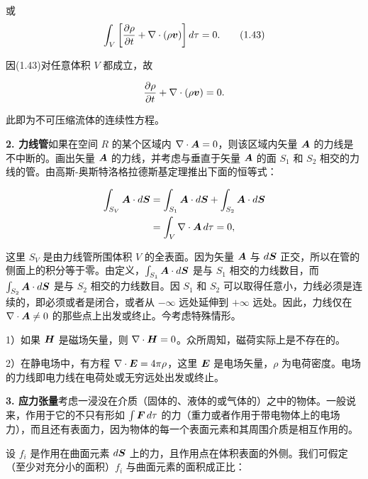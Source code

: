 或
\begin{equation}
\int_{V} \left[\frac{\partial\rho}{\partial t} + \nabla \cdot (\rho\bm{v})\right] d\tau = 0.
\tag{1.43}
\end{equation}

因(1.43)对任意体积 $V$ 都成立，故

\begin{equation*}
\frac{\partial\rho}{\partial t} + \nabla \cdot (\rho\bm{v}) = 0.
\end{equation*}

此即为不可压缩流体的连续性方程。

\textbf{2. 力线管}\quad 如果在空间 $R$ 的某个区域内 $\nabla \cdot \bm{A} = 0$，则该区域内矢量 $\bm{A}$ 的力线是不中断的。画出矢量 $\bm{A}$ 的力线，并考虑与垂直于矢量 $\bm{A}$ 的面 $S_1$ 和 $S_2$ 相交的力线的管。由高斯-奥斯特洛格拉德斯基定理推出下面的恒等式：

\begin{equation*}
\begin{aligned}
\int_{S_V} \bm{A} \cdot d\bm{S} &= \int_{S_1} \bm{A} \cdot d\bm{S} + \int_{S_2} \bm{A} \cdot d\bm{S}\\
&= \int_{V} \nabla \cdot \bm{A}\, d\tau = 0,
\end{aligned}
\end{equation*}

这里 $S_V$ 是由力线管所围体积 $V$ 的全表面。因为矢量 $\bm{A}$ 与 $d\bm{S}$ 正交，所以在管的侧面上的积分等于零。由定义，$\int_{S_1} \bm{A} \cdot d\bm{S}$ 是与 $S_1$ 相交的力线数目，而 $\int_{S_2} \bm{A} \cdot d\bm{S}$ 是与 $S_2$ 相交的力线数目。因 $S_1$ 和 $S_2$ 可以取得任意小，力线必须是连续的，即必须或者是闭合，或者从 $-\infty$ 远处延伸到 $+\infty$ 远处。因此，力线仅在 $\nabla \cdot \bm{A} \neq 0$ 的那些点上出发或终止。今考虑特殊情形。

1）如果 $\bm{H}$ 是磁场矢量，则 $\nabla \cdot \bm{H} = 0$。众所周知，磁荷实际上是不存在的。

2）在静电场中，有方程 $\nabla \cdot \bm{E} = 4\pi\rho$，这里 $\bm{E}$ 是电场矢量，$\rho$ 为电荷密度。电场的力线即电力线在电荷处或无穷远处出发或终止。

\textbf{3. 应力张量}\quad 考虑一浸没在介质（固体的、液体的或气体的）之中的物体。一般说来，作用于它的不只有形如 $\int \bm{F}\, d\tau$ 的力（重力或者作用于带电物体上的电场力），而且还有表面力，因为物体的每一个表面元素和其周围介质是相互作用的。

设 $f_i$ 是作用在曲面元素 $d\bm{S}$ 上的力，且作用点在体积表面的外侧。我们可假定（至少对充分小的面积）$f_i$ 与曲面元素的面积成正比：

